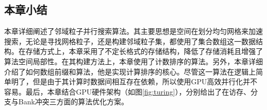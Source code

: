 \subsection{本章小结}
    本章详细阐述了邻域粒子并行搜索算法。其主要思想是空间在划分均匀网格来加速搜索，无论是寻找网格粒子，还是构建邻域粒子集，都使用了集合数组这一数据结构。在存储方式上，本章采用了不定长格式的存储结构，降低了存储消耗且增强了算法空间局部性。在其构建方法上，本章使用了计数排序的算法。另外，本章详细介绍了如何数组前缀和算法，他是实现计算排序的核心。尽管这一算法在逻辑上简单明了，但是由于其计算时数据间相互存在依赖，所以使用GPU高效并行化并不容易。最后，本章结合GPU硬件架构（如图\ref{fig:turing}），分别给出了在访存、分支与Bank冲突三方面的算法优化方案。